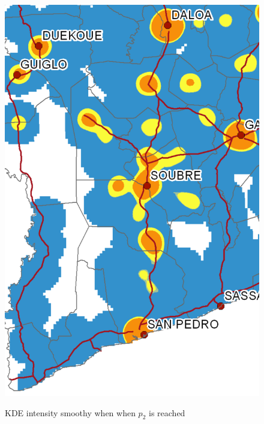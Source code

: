 \begin{figure}
{    \includegraphics[scale = 0.15]{results/images/kernel/x_hour20_kd_detail.pdf}
	\label{fig:subfig2_detail}
}
\caption[KDE intensity smoothy when $p_2$ is reached]{KDE intensity smoothy when when  $p_2$ is reached}
\label{fig:subfigureExample}
\end{figure}




\newpage

